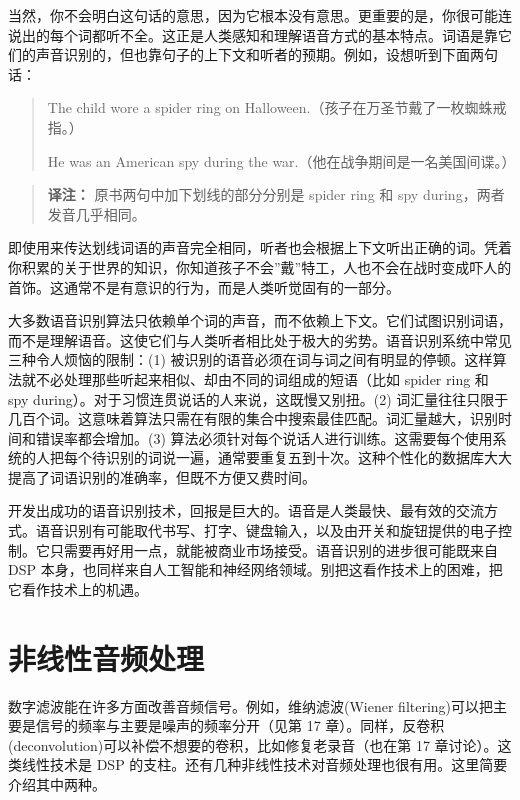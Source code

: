 当然，你不会明白这句话的意思，因为它根本没有意思。更重要的是，你很可能连说出的每个词都听不全。这正是人类感知和理解语音方式的基本特点。词语是靠它们的声音识别的，但也靠句子的上下文和听者的预期。例如，设想听到下面两句话：

\begin{quote}
The child wore a spider ring on
Halloween.（孩子在万圣节戴了一枚蜘蛛戒指。）

He was an American spy during the war.（他在战争期间是一名美国间谍。）
\end{quote}

\begin{quote}
\textbf{译注：} 原书两句中加下划线的部分分别是 spider ring 和 spy
during，两者发音几乎相同。
\end{quote}

即使用来传达划线词语的声音完全相同，听者也会根据上下文听出正确的词。凭着你积累的关于世界的知识，你知道孩子不会''戴''特工，人也不会在战时变成吓人的首饰。这通常不是有意识的行为，而是人类听觉固有的一部分。

大多数语音识别算法只依赖单个词的声音，而不依赖上下文。它们试图识别词语，而不是理解语音。这使它们与人类听者相比处于极大的劣势。语音识别系统中常见三种令人烦恼的限制：(1)
被识别的语音必须在词与词之间有明显的停顿。这样算法就不必处理那些听起来相似、却由不同的词组成的短语（比如
spider ring 和 spy during）。对于习惯连贯说话的人来说，这既慢又别扭。(2)
词汇量往往只限于几百个词。这意味着算法只需在有限的集合中搜索最佳匹配。词汇量越大，识别时间和错误率都会增加。(3)
算法必须针对每个说话人进行训练。这需要每个使用系统的人把每个待识别的词说一遍，通常要重复五到十次。这种个性化的数据库大大提高了词语识别的准确率，但既不方便又费时间。

开发出成功的语音识别技术，回报是巨大的。语音是人类最快、最有效的交流方式。语音识别有可能取代书写、打字、键盘输入，以及由开关和旋钮提供的电子控制。它只需要再好用一点，就能被商业市场接受。语音识别的进步很可能既来自
DSP
本身，也同样来自人工智能和神经网络领域。别把这看作技术上的困难，把它看作技术上的机遇。

\section{非线性音频处理}

数字滤波能在许多方面改善音频信号。例如，维纳滤波(Wiener
filtering)可以把主要是信号的频率与主要是噪声的频率分开（见第 17
章）。同样，反卷积(deconvolution)可以补偿不想要的卷积，比如修复老录音（也在第
17 章讨论）。这类线性技术是 DSP
的支柱。还有几种非线性技术对音频处理也很有用。这里简要介绍其中两种。

